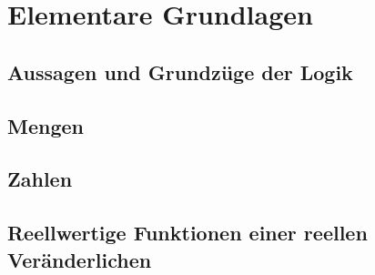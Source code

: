 \newcommand{\customDir}{../}








%



\maketitle
\newpage
\tableofcontents
\newpage

\chapter{Elementare Grundlagen}

\section{Aussagen und Grundzüge der Logik}


\section{Mengen}\label{sec:Mengen}


\section{Zahlen}


\section{Reellwertige Funktionen einer reellen Veränderlichen}



